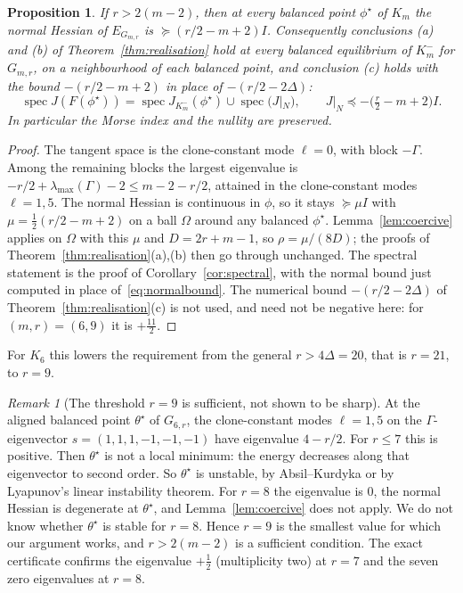 \documentclass[11pt,a4paper]{article}
\newtheorem{proposition}[theorem]{Proposition}
\theoremstyle{definition}\newtheorem{conjecture}{Conjecture}
\theoremstyle{remark}\newtheorem{remark}[theorem]{Remark}
\begin{document}
\begin{proposition}\label{prop:sharper}
If $r>2(m-2)$, then at every balanced point $\phi^\star$ of $K_m$ the normal Hessian of $E_{G_{m,r}}$ is $\succeq(r/2-m+2)I$. Consequently conclusions (a) and (b) of Theorem~\ref{thm:realisation} hold at every balanced equilibrium of $K_m^-$ for $G_{m,r}$, on a neighbourhood of each balanced point, and conclusion (c) holds with the bound $-(r/2-m+2)$ in place of $-(r/2-2\Delta)$:
\[
 \operatorname{spec}J(F(\phi^\star))=\operatorname{spec}J_{K_m^-}(\phi^\star)\cup\operatorname{spec}\bigl(J|_N\bigr),\qquad J|_N\preceq-\bigl(\tfrac r2-m+2\bigr)I .
\]
In particular the Morse index and the nullity are preserved.
\end{proposition}
\begin{proof}
The tangent space is the clone-constant mode $\ell=0$, with block $-\Gamma$. Among the remaining blocks the largest eigenvalue is $-r/2+\lambda_{\max}(\Gamma)-2\le m-2-r/2$, attained in the clone-constant modes $\ell=1,5$. The normal Hessian is continuous in $\phi$, so it stays $\succeq\mu I$ with $\mu=\tfrac12(r/2-m+2)$ on a ball $\Omega$ around any balanced $\phi^\star$. Lemma~\ref{lem:coercive} applies on $\Omega$ with this $\mu$ and $D=2r+m-1$, so $\rho=\mu/(8D)$; the proofs of Theorem~\ref{thm:realisation}(a),(b) then go through unchanged. The spectral statement is the proof of Corollary~\ref{cor:spectral}, with the normal bound just computed in place of~\eqref{eq:normalbound}. The numerical bound $-(r/2-2\Delta)$ of Theorem~\ref{thm:realisation}(c) is not used, and need not be negative here: for $(m,r)=(6,9)$ it is $+\tfrac{11}2$.
\end{proof}

For $K_6$ this lowers the requirement from the general $r>4\Delta=20$, that is $r=21$, to $r=9$.

\begin{remark}[The threshold $r=9$ is sufficient, not shown to be sharp]\label{rem:threshold}
At the aligned balanced point $\theta^\star$ of $G_{6,r}$, the clone-constant modes $\ell=1,5$ on the $\Gamma$-eigenvector $s=(1,1,1,-1,-1,-1)$ have eigenvalue $4-r/2$. For $r\le7$ this is positive. Then $\theta^\star$ is not a local minimum: the energy decreases along that eigenvector to second order. So $\theta^\star$ is unstable, by Absil--Kurdyka or by Lyapunov's linear instability theorem. For $r=8$ the eigenvalue is $0$, the normal Hessian is degenerate at $\theta^\star$, and Lemma~\ref{lem:coercive} does not apply. We do not know whether $\theta^\star$ is stable for $r=8$. Hence $r=9$ is the smallest value for which our argument works, and $r>2(m-2)$ is a sufficient condition. The exact certificate confirms the eigenvalue $+\tfrac12$ (multiplicity two) at $r=7$ and the seven zero eigenvalues at $r=8$.
\end{remark}
\end{document}
